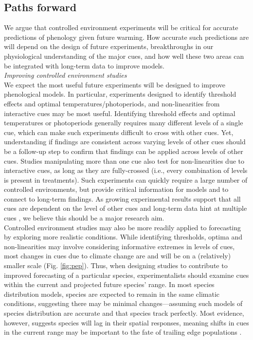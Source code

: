 \documentclass[11pt,letter]{article}
\begin{document}
\subsection{Paths forward} 
We argue that controlled environment experiments will be critical for accurate predictions of phenology given future warming. How accurate such predictions are will depend on the design of future experiments, breakthroughs in our physiological understanding of the major cues, and how well these two areas can be integrated with long-term data to improve models. \\

\emph{Improving controlled environment studies}\\
We expect the most useful future experiments will be designed to improve phenological models. In particular, experiments designed to identify threshold effects and optimal temperatures/photoperiods, and non-linearities from interactive cues may be most useful. Identifying threshold effects and optimal temperatures or photoperiods generally requires many different levels of a single cue, which can make such experiments difficult to cross with other cues. Yet, understanding if findings are consistent across varying levels of other cues should be a follow-up step to confirm that findings can be applied across levels of other cues. Studies manipulating more than one cue also test for non-linearities due to interactive cues, as long as they are fully-crossed (i.e., every combination of levels is present in treatments). Such experiments can quickly require a large number of controlled environments, but provide critical information for models and to connect to long-term findings. As growing experimental results support that all cues are dependent on the level of other cues \citep{stearns1958,flynn2018} and long-term data hint at multiple cues \citep{fu2015}, we believe this should be a major research aim.\\

Controlled environment studies may also be more readily applied to forecasting by exploring more realistic conditions. While identifying thresholds, optima and non-linearities may involve considering informative extremes in levels of cues, most changes in cues due to climate change are and will be on a (relatively) smaller scale (Fig. \ref{fig:pep}). Thus, when designing studies to contribute to improved forecasting of a particular species, experimentalists should examine cues within the current and projected future species' range. In most species distribution models, species are expected to remain in the same climatic conditions, suggesting there may be minimal changes---assuming such models of species distribution are accurate and that species track perfectly. Most evidence, however, suggests species will lag in their spatial responses, meaning shifts in cues in the current range may be important to the fate of trailing edge populations \citep{bertrand2011changes,lenoir2015climate,savage2015elevational}. \\ %
\end{document}
